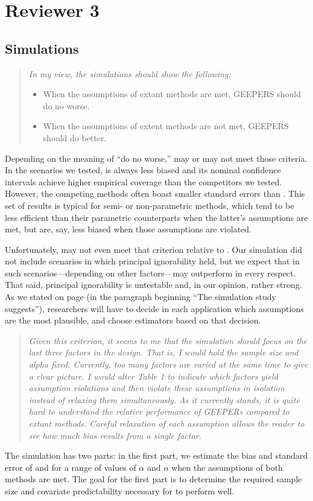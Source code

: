 \documentclass[]{article}
\newenvironment{itquote}
  {\begin{quote} \itshape}
  {\end{quote}\ignorespacesafterend}
\begin{document}
\section{Reviewer 3}


\subsection{Simulations}
\begin{itquote}
    In my view, the simulations should show the following:
\begin{itemize}
   \item When the assumptions of extant methods are met, GEEPERS should do no worse.
   \item When the assumptions of extent methods are not met, GEEPERS should do better.
\end{itemize}
\end{itquote}
Depending on the meaning of ``do no worse,'' \geepers may or may not meet those criteria. 
In the scenarios we tested, \geepers is always less biased and its nominal confidence intervals achieve higher empirical coverage than the competitors we tested.
However, the competing methods often boast smaller standard errors than \geepers. 
This set of results is typical for semi- or non-parametric methods, which tend to be less efficient than their parametric counterparts when the latter's assumptions are met, but are, say, less biased when those assumptions are violated.

Unfortunately, \geepers may not even meet that criterion relative to \psw. Our simulation did not include scenarios in which principal ignorability held, but we expect that in such scenarios---depending on other factors---\psw may outperform \geepers in every respect. 
That said, principal ignorability is untestable and, in our opinion, rather strong. 
As we stated on page \pageref{evalMetric} (in the paragraph beginning ``The simulation study suggests''), researchers will have to decide in each application which assumptions are the most plausible, and choose estimators based on that decision. 

\begin{itquote} Given this criterion, it seems to me that the simulation should focus on the last three factors in the design.  That is, I would hold the sample size and alpha fixed.  Currently, too many factors are varied at the same time to give a clear picture.  
I would alter Table 1 to indicate which factors yield assumption violations and then violate these assumptions in isolation instead of relaxing them simultaneously.  As it currently stands, it is quite hard to understand the relative performance of GEEPERs compared to extant methods. Careful relaxation of each assumption allows the reader to see how much bias results from a single factor. 
\end{itquote}
The simulation has two parts: in the first part, we estimate the bias and standard error of \geepers and \pmm for a range of values of $\alpha$ and $n$ when the assumptions of both methods are met.
The goal for the first part is to determine the required sample size and covariate predictability necessary for \geepers to perform well. 
\end{document}
